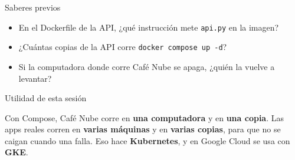 \documentclass[aspectratio=169,10pt,c]{beamer}
\begin{document}
\begin{frame}{Saberes previos}
\begin{itemize}\setlength\itemsep{14pt}
  \item En el Dockerfile de la API, ¿qué instrucción mete \texttt{api.py} en la imagen?
  \item ¿Cuántas copias de la API corre \texttt{docker compose up -d}?
  \item Si la computadora donde corre Café Nube se apaga, ¿quién la vuelve a levantar?
\end{itemize}
\end{frame}

\begin{frame}[c]{Utilidad de esta sesión}
\begin{center}
\begin{minipage}{.84\textwidth}
{\large Con Compose, Café Nube corre en \textbf{una computadora} y en \textbf{una copia}. Las apps reales corren en \textbf{varias máquinas} y en \textbf{varias copias}, para que no se caigan cuando una falla. Eso hace \textbf{Kubernetes}, y en Google Cloud se usa con \textbf{GKE}.}
\end{minipage}
\end{center}
\end{frame}
\end{document}
